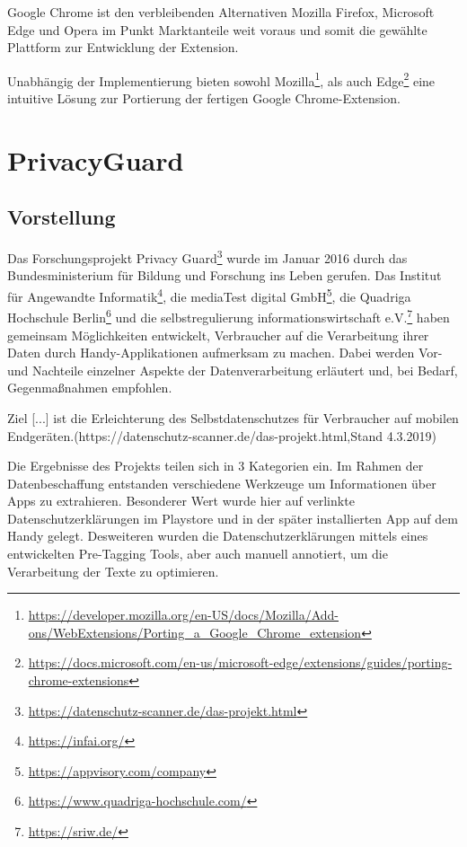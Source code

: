 Google Chrome ist den verbleibenden Alternativen Mozilla Firefox, Microsoft Edge und Opera im Punkt Marktanteile weit voraus und somit die gewählte Plattform zur Entwicklung der Extension.

Unabhängig der Implementierung bieten sowohl Mozilla\footnote{\url{https://developer.mozilla.org/en-US/docs/Mozilla/Add-ons/WebExtensions/Porting_a_Google_Chrome_extension}}, als auch Edge\footnote{\url{https://docs.microsoft.com/en-us/microsoft-edge/extensions/guides/porting-chrome-extensions}} eine intuitive Lösung zur Portierung der fertigen Google Chrome-Extension.

\section{PrivacyGuard}
\label{s:pguard}

\subsection{Vorstellung}
\label{ss:vorstellung}
Das Forschungsprojekt Privacy Guard\footnote{\url{https://datenschutz-scanner.de/das-projekt.html}} wurde im Januar 2016 durch das Bundesministerium für Bildung und Forschung ins Leben gerufen. Das Institut für Angewandte Informatik\footnote{\url{https://infai.org/}}, die mediaTest digital GmbH\footnote{\url{https://appvisory.com/company}}, die Quadriga Hochschule Berlin\footnote{\url{https://www.quadriga-hochschule.com/}} und die selbstregulierung informationswirtschaft e.V.\footnote{\url{https://sriw.de/}} haben gemeinsam Möglichkeiten entwickelt, Verbraucher auf die Verarbeitung ihrer Daten durch Handy-Applikationen aufmerksam zu machen. Dabei werden Vor- und Nachteile einzelner Aspekte der Datenverarbeitung erläutert und, bei Bedarf, Gegenmaßnahmen empfohlen.

\glqq Ziel [...] ist die Erleichterung des Selbstdatenschutzes für Verbraucher auf mobilen Endgeräten.\glqq{}(https://datenschutz-scanner.de/das-projekt.html,Stand 4.3.2019)

Die Ergebnisse des Projekts teilen sich in 3 Kategorien ein. Im Rahmen der Datenbeschaffung entstanden verschiedene Werkzeuge um Informationen über Apps zu extrahieren. Besonderer Wert wurde hier auf verlinkte Datenschutzerklärungen im Playstore und in der später installierten App auf dem Handy gelegt. Desweiteren wurden die Datenschutzerklärungen mittels eines entwickelten Pre-Tagging Tools, aber auch manuell annotiert, um die Verarbeitung der Texte zu optimieren.

